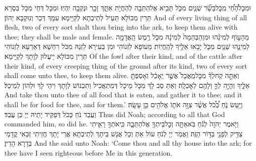 {וּמִכׇּל\maqqaf הָ֠חַ֠י מִֽכׇּל\maqqaf בָּשָׂ֞ר שְׁנַ֧יִם מִכֹּ֛ל תָּבִ֥יא אֶל\maqqaf הַתֵּבָ֖ה לְהַחֲיֹ֣ת אִתָּ֑ךְ זָכָ֥ר וּנְקֵבָ֖ה יִֽהְיֽוּ׃}
{וּמִכָּל דְּחַי מִכָּל בִּסְרָא תְּרֵין מִכּוֹלָא תַּעֵיל לְתֵיבְתָא לְקַיָּימָא עִמָּךְ דְּכַר וְנוּקְבָּא יְהוֹן׃}
{And of every living thing of all flesh, two of every sort shalt thou bring into the ark, to keep them alive with thee; they shall be male and female.}{}
{מֵהָע֣וֹף לְמִינֵ֗הוּ וּמִן\maqqaf הַבְּהֵמָה֙ לְמִינָ֔הּ מִכֹּ֛ל רֶ֥מֶשׂ הָֽאֲדָמָ֖ה לְמִינֵ֑הוּ שְׁנַ֧יִם מִכֹּ֛ל יָבֹ֥אוּ אֵלֶ֖יךָ לְהַֽחֲיֽוֹת׃}
{מֵעוֹפָא לִזְנוֹהִי וּמִן בְּעִירָא לִזְנַהּ מִכֹּל רִחְשָׁא דְּאַרְעָא לִזְנוֹהִי תְּרֵין מִכּוֹלָא יֵיעֲלוּן לְוָתָךְ לְקַיָּימָא׃}
{Of the fowl after their kind, and of the cattle after their kind, of every creeping thing of the ground after its kind, two of every sort shall come unto thee, to keep them alive.}{}
{וְאַתָּ֣ה קַח\maqqaf לְךָ֗ מִכׇּל\maqqaf מַֽאֲכָל֙ אֲשֶׁ֣ר יֵֽאָכֵ֔ל וְאָסַפְתָּ֖ אֵלֶ֑יךָ וְהָיָ֥ה לְךָ֛ וְלָהֶ֖ם לְאׇכְלָֽה׃}
{וְאַתְּ סַב לָךְ מִכָּל מֵיכָל דְּמִתְאֲכִיל וְתִכְנוֹשׁ לְוָתָךְ וִיהֵי לָךְ וּלְהוֹן לְמֵיכַל׃}
{And take thou unto thee of all food that is eaten, and gather it to thee; and it shall be for food for thee, and for them.’}{}
{וַיַּ֖עַשׂ נֹ֑חַ כְּ֠כֹ֠ל אֲשֶׁ֨ר צִוָּ֥ה אֹת֛וֹ אֱלֹהִ֖ים כֵּ֥ן עָשָֽׂה׃}
{וַעֲבַד נֹחַ כְּכֹל דְּפַקֵּיד יָתֵיהּ יְיָ כֵּן עֲבַד׃}
{Thus did Noah; according to all that God commanded him, so did he.}{}
\newperek
{}
{וַיֹּ֤אמֶר יְהֹוָה֙ לְנֹ֔חַ בֹּֽא\maqqaf אַתָּ֥ה וְכׇל\maqqaf בֵּיתְךָ֖ אֶל\maqqaf הַתֵּבָ֑ה כִּֽי\maqqaf אֹתְךָ֥ רָאִ֛יתִי צַדִּ֥יק לְפָנַ֖י בַּדּ֥וֹר הַזֶּֽה׃}
{וַאֲמַר יְיָ לְנֹחַ עוֹל אַתְּ וְכָל אֲנָשׁ בֵּיתָךְ לְתֵיבְתָא אֲרֵי יָתָךְ חֲזֵיתִי זַכַּאי קֳדָמַי בְּדָרָא הָדֵין׃}
{And the \lord\space said unto Noah: ‘Come thou and all thy house into the ark; for thee have I seen righteous before Me in this generation.}{}
